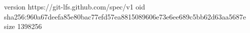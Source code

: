version https://git-lfs.github.com/spec/v1
oid sha256:960a67deefa85e80bac77efd57ea8815089606e73e6ee689c5bb62d63aa5687e
size 1398256
